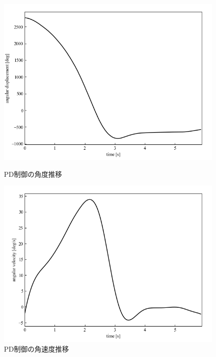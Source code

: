 \begin{figure}[h]
	\centering
	\begin{minipage}{0.43\columnwidth}
	  \centering
	  \includegraphics[width=\columnwidth]{./figure/PDdeg.png}
	  \caption{PD制御の角度推移}
	  \label{fig:PDdeg}
	\end{minipage}
	\hspace{5mm}
	\begin{minipage}{0.43\columnwidth}
	  \centering
	  \includegraphics[width=\columnwidth]{./figure/PDdegpers.png}
	  \caption{PD制御の角速度推移}
	  \label{fig:PDdegpers}
	\end{minipage}
  \end{figure}

